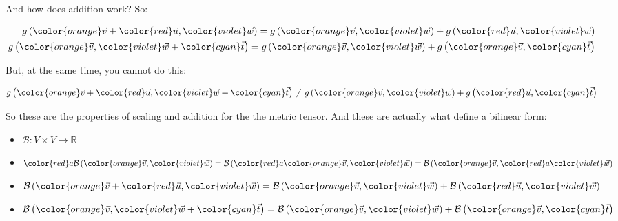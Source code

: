 And how does addition work? So:

\begin{align*}
    g \left(\begingroup\color{orange}\vec{v}\endgroup + \begingroup\color{red}\vec{u}\endgroup, \begingroup\color{violet}\vec{w}\endgroup\right)
    = g \left(\begingroup\color{orange}\vec{v}\endgroup, \begingroup\color{violet}\vec{w}\endgroup\right)
    + g \left(\begingroup\color{red}\vec{u}\endgroup, \begingroup\color{violet}\vec{w}\endgroup\right)\\
    g \left(\begingroup\color{orange}\vec{v}\endgroup, \begingroup\color{violet}\vec{w}\endgroup + \begingroup\color{cyan}\vec{t}\endgroup\right)
    = g \left(\begingroup\color{orange}\vec{v}\endgroup, \begingroup\color{violet}\vec{w}\endgroup\right)
    + g \left(\begingroup\color{orange}\vec{v}\endgroup, \begingroup\color{cyan}\vec{t}\endgroup\right)
\end{align*}

But, at the same time, you cannot do this:

\begin{equation}
    g \left(\begingroup\color{orange}\vec{v}\endgroup + \begingroup\color{red}\vec{u}\endgroup, \begingroup\color{violet}\vec{w}\endgroup + \begingroup\color{cyan}\vec{t}\endgroup\right)
    \neq g \left(\begingroup\color{orange}\vec{v}\endgroup, \begingroup\color{violet}\vec{w}\endgroup\right) + g \left(\begingroup\color{red}\vec{u}\endgroup, \begingroup\color{cyan}\vec{t}\endgroup\right)
\end{equation}

So these are the properties of scaling and addition for the the metric tensor.
And these are actually what define a bilinear form:

\begin{itemize}
    \item $\mathcal{B}: V \times V \to \mathbb{R}$
    \item $\begingroup\color{red}a \endgroup \mathcal{B} \left(\begingroup\color{orange}\vec{v}\endgroup, \begingroup\color{violet}\vec{w}\endgroup\right)
    = \mathcal{B} \left(\begingroup\color{red}a \endgroup\begingroup\color{orange}\vec{v}\endgroup, \begingroup\color{violet}\vec{w}\endgroup\right)
    = \mathcal{B} \left(\begingroup\color{orange}\vec{v}\endgroup, \begingroup\color{red}a \endgroup\begingroup\color{violet}\vec{w}\endgroup\right)$
    \item $\mathcal{B} \left(\begingroup\color{orange}\vec{v}\endgroup + \begingroup\color{red}\vec{u}\endgroup, \begingroup\color{violet}\vec{w}\endgroup\right)
    = \mathcal{B} \left(\begingroup\color{orange}\vec{v}\endgroup, \begingroup\color{violet}\vec{w}\endgroup\right)
    + \mathcal{B} \left(\begingroup\color{red}\vec{u}\endgroup, \begingroup\color{violet}\vec{w}\endgroup\right)$
    \item $\mathcal{B} \left(\begingroup\color{orange}\vec{v}\endgroup, \begingroup\color{violet}\vec{w}\endgroup + \begingroup\color{cyan}\vec{t}\endgroup\right)
    = \mathcal{B} \left(\begingroup\color{orange}\vec{v}\endgroup, \begingroup\color{violet}\vec{w}\endgroup\right)
    + \mathcal{B} \left(\begingroup\color{orange}\vec{v}\endgroup, \begingroup\color{cyan}\vec{t}\endgroup\right)$
\end{itemize}


